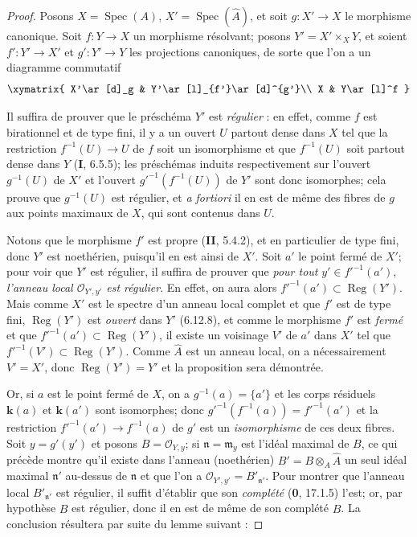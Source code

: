 \begin{proof}
Posons $X=\operatorname{Spec}(A)$, $X'=\operatorname{Spec}(\widehat A)$, et
soit $g:X'\to X$ le morphisme canonique. Soit $f:Y\to X$ un morphisme
résolvant; posons $Y'=X'\times_XY$, et soient $f':Y'\to X'$ et $g':Y'\to Y$
les projections canoniques, de sorte que l'on a un diagramme commutatif
\[
\xymatrix{
X'\ar[d]_g & Y'\ar[l]_{f'}\ar[d]^{g'}\\
X & Y\ar[l]^f
}
\]

Il suffira de prouver que le préschéma $Y'$ est \emph{régulier} : en effet,
comme $f$ est birationnel et de type fini, il y a un ouvert $U$ partout dense
dans $X$ tel que la restriction $f^{-1}(U)\to U$ de $f$ soit un isomorphisme
et que $f^{-1}(U)$ soit partout dense dans $Y$ (\textbf{I}, 6.5.5); les
préschémas induits respectivement sur l'ouvert $g^{-1}(U)$ de $X'$ et l'ouvert
$g'^{-1}(f^{-1}(U))$ de $Y'$ sont donc isomorphes; cela prouve que
$g^{-1}(U)$ est régulier, et \emph{a fortiori} il en est de même des fibres de
$g$ aux points maximaux de $X$, qui sont contenus dans $U$.


Notons que le morphisme $f'$ est propre (\textbf{II}, 5.4.2), et en
particulier de type fini, donc $Y'$ est noethérien, puisqu'il en est ainsi de
$X'$. Soit $a'$ le point fermé de $X'$; pour voir que $Y'$ est régulier, il
suffira de prouver que \emph{pour tout} $y'\in f'^{-1}(a')$, \emph{l'anneau
local $\mathcal O_{Y',y'}$ est régulier}. En effet, on aura alors
$f'^{-1}(a')\subset\operatorname{Reg}(Y')$. Mais comme $X'$ est le spectre
d'un anneau local complet et que $f'$ est de type fini,
$\operatorname{Reg}(Y')$ est \emph{ouvert} dans $Y'$ (6.12.8), et comme le
morphisme $f'$ est \emph{fermé} et que
$f'^{-1}(a')\subset\operatorname{Reg}(Y')$, il existe un voisinage $V'$ de
$a'$ dans $X'$ tel que $f'^{-1}(V')\subset\operatorname{Reg}(Y')$. Comme
$\widehat A$ est un anneau local, on a nécessairement $V'=X'$, donc
$\operatorname{Reg}(Y')=Y'$ et la proposition sera démontrée.

Or, si $a$ est le point fermé de $X$, on a $g^{-1}(a)=\{a'\}$ et les corps
résiduels $\boldsymbol{k}(a)$ et $\boldsymbol{k}(a')$ sont isomorphes; donc
$g'^{-1}(f^{-1}(a))=f'^{-1}(a')$ et la restriction
$f'^{-1}(a')\to f^{-1}(a)$ de $g'$ est un \emph{isomorphisme} de ces deux
fibres. Soit $y=g'(y')$ et posons $B=\mathcal O_{Y,y}$; si
$\mathfrak n=\mathfrak m_y$ est l'idéal maximal de $B$, ce qui précède montre
qu'il existe dans l'anneau (noethérien) $B'=B\otimes_A\widehat A$ un seul
idéal maximal $\mathfrak n'$ au-dessus de $\mathfrak n$ et que l'on a
$\mathcal O_{Y',y'}=B'_{\mathfrak n'}$. Pour montrer que l'anneau local
$B'_{\mathfrak n'}$ est régulier, il suffit d'établir que son \emph{complété}
(\textbf{0}, 17.1.5) l'est; or, par hypothèse $B$ est régulier, donc il en est de même
de son complété $\widehat B$. La conclusion résultera par suite du lemme
suivant :


\end{proof}
